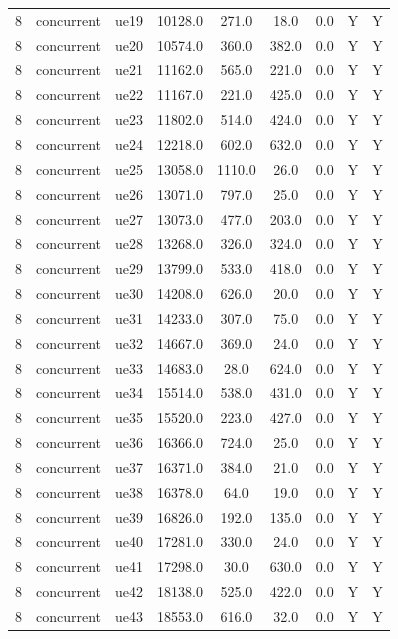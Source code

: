 \begin{table}[ht]
\begin{tabular}{|c|c|c|c|c|c|c|c|c|}
8 & concurrent & ue19 & 10128.0 & 271.0 & 18.0 & 0.0 & Y & Y \\
8 & concurrent & ue20 & 10574.0 & 360.0 & 382.0 & 0.0 & Y & Y \\
8 & concurrent & ue21 & 11162.0 & 565.0 & 221.0 & 0.0 & Y & Y \\
8 & concurrent & ue22 & 11167.0 & 221.0 & 425.0 & 0.0 & Y & Y \\
8 & concurrent & ue23 & 11802.0 & 514.0 & 424.0 & 0.0 & Y & Y \\
8 & concurrent & ue24 & 12218.0 & 602.0 & 632.0 & 0.0 & Y & Y \\
8 & concurrent & ue25 & 13058.0 & 1110.0 & 26.0 & 0.0 & Y & Y \\
8 & concurrent & ue26 & 13071.0 & 797.0 & 25.0 & 0.0 & Y & Y \\
8 & concurrent & ue27 & 13073.0 & 477.0 & 203.0 & 0.0 & Y & Y \\
8 & concurrent & ue28 & 13268.0 & 326.0 & 324.0 & 0.0 & Y & Y \\
8 & concurrent & ue29 & 13799.0 & 533.0 & 418.0 & 0.0 & Y & Y \\
8 & concurrent & ue30 & 14208.0 & 626.0 & 20.0 & 0.0 & Y & Y \\
8 & concurrent & ue31 & 14233.0 & 307.0 & 75.0 & 0.0 & Y & Y \\
8 & concurrent & ue32 & 14667.0 & 369.0 & 24.0 & 0.0 & Y & Y \\
8 & concurrent & ue33 & 14683.0 & 28.0 & 624.0 & 0.0 & Y & Y \\
8 & concurrent & ue34 & 15514.0 & 538.0 & 431.0 & 0.0 & Y & Y \\
8 & concurrent & ue35 & 15520.0 & 223.0 & 427.0 & 0.0 & Y & Y \\
8 & concurrent & ue36 & 16366.0 & 724.0 & 25.0 & 0.0 & Y & Y \\
8 & concurrent & ue37 & 16371.0 & 384.0 & 21.0 & 0.0 & Y & Y \\
8 & concurrent & ue38 & 16378.0 & 64.0 & 19.0 & 0.0 & Y & Y \\
8 & concurrent & ue39 & 16826.0 & 192.0 & 135.0 & 0.0 & Y & Y \\
8 & concurrent & ue40 & 17281.0 & 330.0 & 24.0 & 0.0 & Y & Y \\
8 & concurrent & ue41 & 17298.0 & 30.0 & 630.0 & 0.0 & Y & Y \\
8 & concurrent & ue42 & 18138.0 & 525.0 & 422.0 & 0.0 & Y & Y \\
8 & concurrent & ue43 & 18553.0 & 616.0 & 32.0 & 0.0 & Y & Y \\

\end{tabular}
\end{table}
